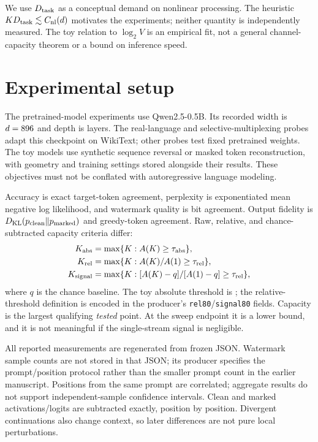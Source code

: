 \documentclass[11pt]{article}
\begin{document}
We use $D_{\rm task}$ as a conceptual demand on nonlinear processing. The heuristic $K D_{\rm task}\lesssim C_{\rm nl}(d)$ motivates the experiments; neither quantity is independently measured. The toy relation to $\log_2 V$ is an empirical fit, not a general channel-capacity theorem or a bound on inference speed.

\section{Experimental setup}
The pretrained-model experiments use Qwen2.5-0.5B. Its recorded width is $d=896$ and depth is \modelLayers{} layers. The real-language and selective-multiplexing probes adapt this checkpoint on WikiText; other probes test fixed pretrained weights. The toy models use synthetic sequence reversal or masked token reconstruction, with geometry and training settings stored alongside their results. These objectives must not be conflated with autoregressive language modeling.

Accuracy is exact target-token agreement, perplexity is exponentiated mean negative log likelihood, and watermark quality is bit agreement. Output fidelity is $D_{\rm KL}(p_{\rm clean}\Vert p_{\rm marked})$ and greedy-token agreement. Raw, relative, and chance-subtracted capacity criteria differ:
\begin{align}
 K_{\rm abs}&=\max\{K:A(K)\geq\tau_{\rm abs}\},\\
 K_{\rm rel}&=\max\{K:A(K)/A(1)\geq\tau_{\rm rel}\},\\
 K_{\rm signal}&=\max\{K:[A(K)-q]/[A(1)-q]\geq\tau_{\rm rel}\},
 \label{eq:capacity}
\end{align}
where $q$ is the chance baseline. The toy absolute threshold is \toyThreshold; the relative-threshold definition is encoded in the producer's \texttt{rel80}/\texttt{signal80} fields. Capacity is the largest qualifying \emph{tested} point. At the sweep endpoint it is a lower bound, and it is not meaningful if the single-stream signal is negligible.

All reported measurements are regenerated from frozen JSON. Watermark sample counts are not stored in that JSON; its producer specifies the prompt/position protocol rather than the smaller prompt count in the earlier manuscript. Positions from the same prompt are correlated; aggregate results do not support independent-sample confidence intervals. Clean and marked activations/logits are subtracted exactly, position by position. Divergent continuations also change context, so later differences are not pure local perturbations.
\end{document}

